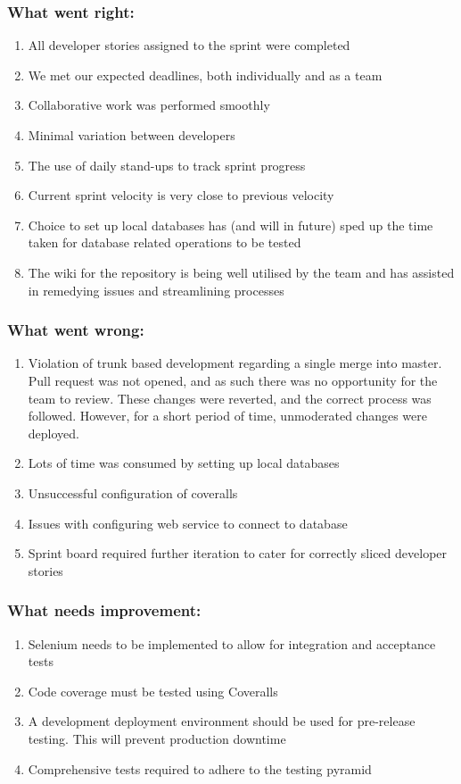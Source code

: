 \documentclass[10pt,onecolumn]{witseiepaper}
\begin{document}
\subsubsection*{What went right:}
\begin{enumerate}
	\item All developer stories assigned to the sprint were completed
	\item We met our expected deadlines, both individually and as a team
	\item Collaborative work was performed smoothly
	\item Minimal variation between developers 
	\item The use of daily stand-ups to track sprint progress
	\item Current sprint velocity is very close to previous velocity
	\item Choice to set up local databases has (and will in future) sped up the time taken for database related operations to be tested
	\item The wiki for the repository is being well utilised by the team and has assisted in remedying issues and streamlining processes
\end{enumerate}

\subsubsection*{What went wrong:}
\begin{enumerate}
	\item Violation of trunk based development regarding a single merge into master. Pull request was not opened, and as such there was no opportunity for the team to review. These changes were reverted, and the correct process was followed. However, for a short period of time, unmoderated changes were deployed.
	\item Lots of time was consumed by setting up local databases
	\item Unsuccessful configuration of coveralls
	\item Issues with configuring web service to connect to database
	\item Sprint board required further iteration to cater for correctly sliced developer stories
\end{enumerate}

\subsubsection*{What needs improvement:}
\begin{enumerate}
	\item Selenium needs to be implemented to allow for integration and acceptance tests
	\item Code coverage must be tested using Coveralls
	\item A development deployment environment should be used for pre-release testing. This will prevent production downtime
	\item Comprehensive tests required to adhere to the testing pyramid
\end{enumerate}
\end{document}
